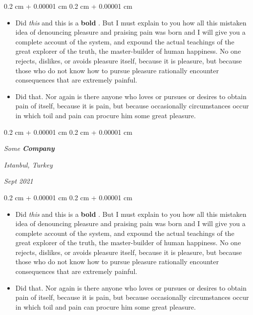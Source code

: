 \documentclass[10pt, letterpaper]{article}
\newenvironment{highlights}{
    \begin{itemize}[
        topsep=0.10 cm,
        parsep=0.10 cm,
        partopsep=0pt,
        itemsep=0pt,
        leftmargin=0.4 cm + 10pt
    ]
}{
    \end{itemize}
} %
\newenvironment{onecolentry}{
    \begin{adjustwidth}{
        0.2 cm + 0.00001 cm
    }{
        0.2 cm + 0.00001 cm
    }
}{
    \end{adjustwidth}
} %
\newenvironment{twocolentry}[2][]{
    \onecolentry
    \def\secondColumn{#2}
    \setcolumnwidth{\fill, 4.5 cm}
    \begin{paracol}{2}
}{
    \switchcolumn \raggedleft \secondColumn
    \end{paracol}
    \endonecolentry
} %
\let\hrefWithoutArrow\href
\renewcommand{\href}[2]{\hrefWithoutArrow{#1}{\ifthenelse{\equal{#2}{}}{ }{#2 }\raisebox{.15ex}{\footnotesize \faExternalLink*}}}
\begin{document}
        \vspace{0.10 cm}
        \begin{onecolentry}
            \begin{highlights}
                \item Did \textit{this} and this is a \textbf{bold} \href{https://example.com}{link}. But I must explain to you how all this mistaken idea of denouncing pleasure and praising pain was born and I will give you a complete account of the system, and expound the actual teachings of the great explorer of the truth, the master-builder of human happiness. No one rejects, dislikes, or avoids pleasure itself, because it is pleasure, but because those who do not know how to pursue pleasure rationally encounter consequences that are extremely painful.
                \item Did that. Nor again is there anyone who loves or pursues or desires to obtain pain of itself, because it is pain, but because occasionally circumstances occur in which toil and pain can procure him some great pleasure.
            \end{highlights}
        \end{onecolentry}


        \vspace{0.2 cm}

            \begin{twocolentry}{
        \textit{Istanbul, Turkey}

        \textit{Sept 2021}    }
                \textbf{}

                \textit{Some \textbf{Company}}
            \end{twocolentry}

        \vspace{0.10 cm}
        \begin{onecolentry}
            \begin{highlights}
                \item Did \textit{this} and this is a \textbf{bold} \href{https://example.com}{link}. But I must explain to you how all this mistaken idea of denouncing pleasure and praising pain was born and I will give you a complete account of the system, and expound the actual teachings of the great explorer of the truth, the master-builder of human happiness. No one rejects, dislikes, or avoids pleasure itself, because it is pleasure, but because those who do not know how to pursue pleasure rationally encounter consequences that are extremely painful.
                \item Did that. Nor again is there anyone who loves or pursues or desires to obtain pain of itself, because it is pain, but because occasionally circumstances occur in which toil and pain can procure him some great pleasure.
            \end{highlights}
        \end{onecolentry}
\end{document}
